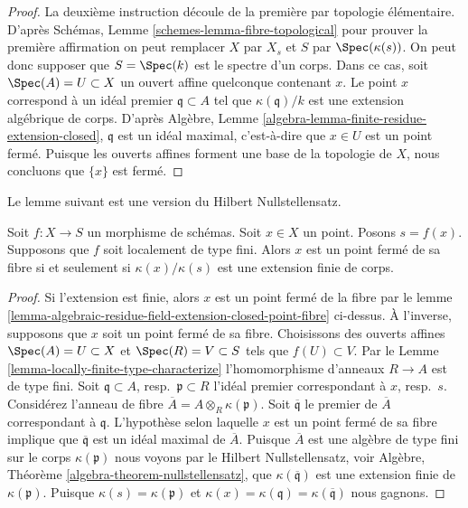 \begin{proof}
La deuxième instruction découle de la première par topologie élémentaire.
D'après Schémas, Lemme \ref{schemes-lemma-fibre-topological} pour prouver la première
affirmation on peut
remplacer $X$ par $X_s$ et $S$ par
$\Spec(\kappa(s))$. On peut donc supposer que $S = \Spec(k)$ est le spectre
d'un corps. Dans ce cas, soit $\Spec(A) = U \subset X$ un ouvert affine quelconque
contenant $x$. Le point $x$ correspond
à un idéal premier $\mathfrak q \subset A$ tel que $\kappa(\mathfrak q)/k$ est
une extension algébrique de corps.
D'après Algèbre, Lemme \ref{algebra-lemma-finite-residue-extension-closed}, $\mathfrak q$ est
un idéal maximal, c'est-à-dire que $x \in U$ est un point fermé.
Puisque les ouverts affines forment
une base de la topologie de $X$, nous concluons que $\{x\}$ est fermé.
\end{proof}

\noindent
Le lemme suivant est une version du Hilbert Nullstellensatz.

\begin{lemma}
\label{lemma-closed-point-fibre-locally-finite-type}
Soit $f : X \to S$ un morphisme de schémas. Soit $x \in X$
un point. Posons $s = f(x)$. Supposons
que $f$ soit localement de type
fini. Alors $x$ est un point fermé de
sa fibre si et seulement si $\kappa(x)/\kappa(s)$ est
une extension finie de corps.
\end{lemma}

\begin{proof}
Si l'extension est finie, alors $x$ est
un point
fermé de la fibre par le lemme \ref{lemma-algebraic-residue-field-extension-closed-point-fibre} ci-dessus. À l'inverse,
supposons que $x$ soit un point
fermé de sa fibre. Choisissons des ouverts affines
$\Spec(A) = U \subset X$ et $\Spec(R) = V \subset S$ tels que $f(U) \subset V$.
Par le Lemme \ref{lemma-locally-finite-type-characterize} l'homomorphisme d'anneaux $R \to A$
est de type fini. Soit $\mathfrak q \subset A$, resp.\ $\mathfrak p \subset R$
l'idéal premier correspondant à
$x$, resp.\ $s$.
Considérez l'anneau de fibre $\overline{A} = A \otimes_R \kappa(\mathfrak p)$.
Soit $\overline{\mathfrak q}$ le premier de $\overline{A}$
correspondant à $\mathfrak q$. L'hypothèse selon
laquelle $x$ est un point fermé de sa fibre
implique que $\overline{\mathfrak q}$ est un idéal maximal
de $\overline{A}$. Puisque $\overline{A}$ est une algèbre
de type fini sur le corps
$\kappa(\mathfrak p)$ nous voyons par le Hilbert Nullstellensatz,
voir Algèbre, Théorème \ref{algebra-theorem-nullstellensatz},
que $\kappa(\overline{\mathfrak q})$
est une extension finie de $\kappa(\mathfrak p)$.
Puisque $\kappa(s) = \kappa(\mathfrak p)$ et $\kappa(x) = \kappa(\mathfrak q) = \kappa(\overline{\mathfrak q})$ nous
gagnons.
\end{proof}

